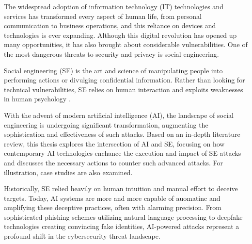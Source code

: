 \begin{comment}
    - Johdannon pituus määräytyy suhteessa koko kirjoitelman pituuteen. Parisivuinen kirjoitus ei erikseen otsikoitua johdantoa kaipaa, sillä se itsessään on laajennettu tiivistelmä. Kymmensivuisen kirjoituksen johdanto voi olla vaikkapa sivun tai puolentoista mittainen. Pro gradu -tutkielman 50-70-sivuiseen kokonaisuuteen tuntuu 2-4-sivuinen johdanto kohtuulliselta.

    - Johdanto kertoo siis lyhyessä, yleistajuisessa muodossa koko kirjoitelman kysymyksenasettelun, juonen sekä tulokset ja johtopäätelmät. Tämän luettuaan lukija voi päätellä, haluaako syventyä asiaan tarkemmin lukemalla koko kirjoituksen.

\end{comment}

The widespread adoption of information technology (IT) technologies and services has transformed every aspect of human life, from personal communication to business operations, and this reliance on devices and technologies is ever expanding. Although this digital revolution has opened up many opportunities, it has also brought about considerable vulnerabilities. One of the most dangerous threats to security and privacy is social engineering.

Social engineering (SE) is the art and science of manipulating people into performing actions or divulging confidential information. Rather than looking for technical vulnerabilities, SE relies on human interaction and exploits weaknesses in human psychology \citep{wangDefiningSocialEngineering2020}.

With the advent of modern artificial intelligence (AI), the landscape of social engineering is undergoing significant transformation, augmenting the sophistication and effectiveness of such attacks. Based on an in-depth literature review, this thesis explores the intersection of AI and SE, focusing on how contemporary AI technologies enchance the execution and impact of SE attacks and discusses the necessary actions to counter such advanced attacks. For illustration, case studies are also examined.

Historically, SE relied heavily on human intuition and manual effort to deceive targets. Today, AI systems are more and more capable of auomatinc and amplifying these deceptive practices, often with alarming precision. From sophisticated phishing schemes utilizing natural language processing to deepfake technologies creating convincing fake identities, AI-powered attacks represent a profound shift in the cybersecurity threat landscape.

